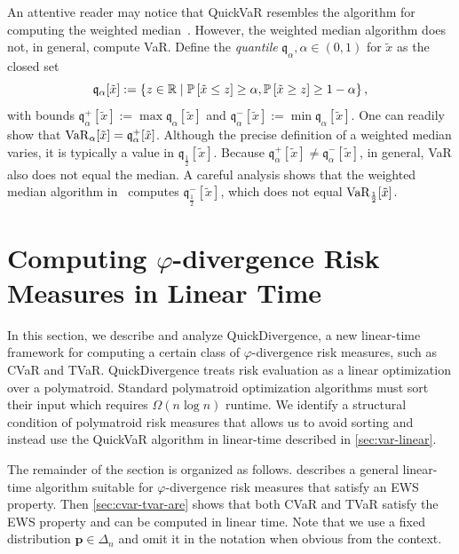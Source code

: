 \documentclass[10pt]{article} %
\newcommand{\quant}{{\mathfrak{q}}}
\renewcommand{\cite}{\citep}
\begin{document}
\begin{remark}
  An attentive reader may notice that QuickVaR resembles the algorithm for computing the weighted median~\cite[section~17]{Korte2012}. However, the weighted median algorithm does not, in general, compute VaR. Define the \emph{quantile} $\quant_{\alpha},\alpha \in (0,1)$ for $\tilde{x}$ as the closed set
\[
 \quant_{\alpha}[\tilde{x}] := \left\{ z\in \Real \mid  \P{ \tilde{x} \le z } \ge \alpha , \P{ \tilde{x} \ge z } \ge 1-\alpha  \right\},
\]
with bounds $\quant^+_{\alpha}[\tilde{x}] := \max \quant_{\alpha}[\tilde{x}]$ and $\quant^-_{\alpha}[\tilde{x}] := \min \quant_{\alpha}[\tilde{x}]$. One can readily show that $\varo_{\alpha }[\tilde{x}] = \quant^+_{\alpha}[\tilde{x}]$. Although the precise definition of a weighted median varies, it is typically a value in $\quant_{\frac{1}{2}}[\tilde{x}]$. Because $\quant^+_{\alpha}[\tilde{x}] \neq \quant^{-}_{\alpha}[\tilde{x}]$, in general, VaR also does not equal the median. A careful analysis shows that the weighted median algorithm in~\citet[section~17]{Korte2012} computes $\quant^-_{\frac{1}{2}}[\tilde{x}]$, which does not equal $\operatorname{VaR}_{\frac{1}{2}}[\tilde{x}]$.
\end{remark}

\section{Computing \texorpdfstring{$\varphi$}{phi}-divergence Risk Measures in Linear Time} \label{sec:phi-divergence}

In this section, we describe and analyze QuickDivergence, a new linear-time framework for computing a certain class of $\varphi$-divergence risk measures, such as CVaR and TVaR. QuickDivergence treats risk evaluation as a linear optimization over a polymatroid. Standard polymatroid optimization algorithms must sort their input which requires $\Omega(n \log  n)$ runtime. We identify a structural condition of polymatroid risk measures that allows us to avoid sorting and instead use the QuickVaR algorithm in linear-time described in \cref{sec:var-linear}.

The remainder of the section is organized as follows.  describes a general linear-time algorithm suitable for $\varphi$-divergence risk measures that satisfy an EWS property. Then \cref{sec:cvar-tvar-are} shows that both CVaR and TVaR satisfy the EWS property and can be computed in linear time. Note that we use a fixed distribution $\bm{p} \in \Delta_n$ and omit it in the notation when obvious from the context.
\end{document}
